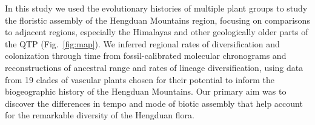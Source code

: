 


In this study we used the evolutionary histories of multiple plant
groups to study the floristic assembly of the Hengduan Mountains
region, focusing on comparisons to adjacent regions, especially the
Himalayas and other geologically older parts of the QTP
(Fig.~\ref{fig:map}). We inferred regional rates of diversification
and colonization through time from fossil-calibrated molecular
chronograms and reconstructions of ancestral range and rates of
lineage diversification, using data from 19 clades of vascular plants
chosen for their potential to inform the biogeographic history of the
Hengduan Mountains. Our primary aim was to discover the differences in
tempo and mode of biotic assembly that help account for the remarkable
diversity of the Hengduan flora.


